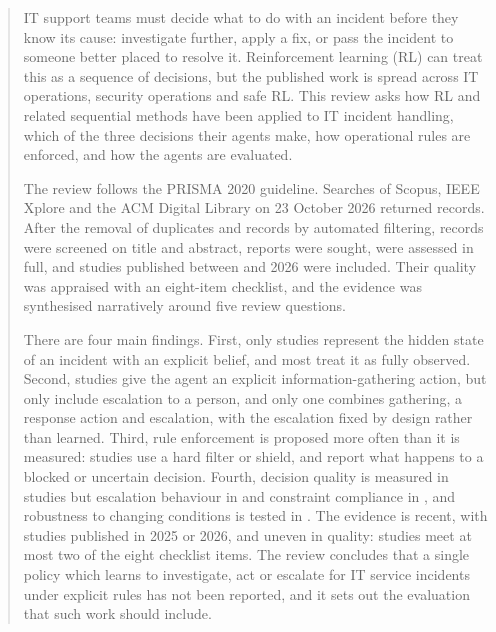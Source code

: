 \begin{abstract}
IT support teams must decide what to do with an incident before they know its cause: investigate further, apply a fix, or pass the incident to someone better placed to resolve it. Reinforcement learning (RL) can treat this as a sequence of decisions, but the published work is spread across IT operations, security operations and safe RL. This review asks how RL and related sequential methods have been applied to IT incident handling, which of the three decisions their agents make, how operational rules are enforced, and how the agents are evaluated.

The review follows the PRISMA 2020 guideline. Searches of Scopus, IEEE Xplore and the ACM Digital Library on 23 October 2026 returned \NIdentified{} records. After the removal of \NDuplicates{} duplicates and \NAuto{} records by automated filtering, \NScreened{} records were screened on title and abstract, \NSought{} reports were sought, \NAssessed{} were assessed in full, and \NIncluded{} studies published between \NYearMin{} and 2026 were included. Their quality was appraised with an eight-item checklist, and the evidence was synthesised narratively around five review questions.

There are four main findings. First, only \NBelief{} studies represent the hidden state of an incident with an explicit belief, and most treat it as fully observed. Second, \NInfo{} studies give the agent an explicit information-gathering action, but only \NEsc{} include escalation to a person, and only one combines gathering, a response action and escalation, with the escalation fixed by design rather than learned. Third, rule enforcement is proposed more often than it is measured: \NShield{} studies use a hard filter or shield, and \NBlocked{} report what happens to a blocked or uncertain decision. Fourth, decision quality is measured in \NDQ{} studies but escalation behaviour in \NEscM{} and constraint compliance in \NComp{}, and robustness to changing conditions is tested in \NRobust{}. The evidence is recent, with \NYearRecent{} studies published in 2025 or 2026, and uneven in quality: \NQLow{} studies meet at most two of the eight checklist items. The review concludes that a single policy which learns to investigate, act or escalate for IT service incidents under explicit rules has not been reported, and it sets out the evaluation that such work should include.
\end{abstract}
